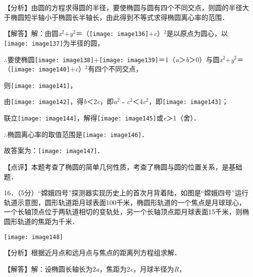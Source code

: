 \documentclass[a4paper,11pt,UTF8,twoside]{ctexart} %
\begin{document}
【分析】由圆的方程求得圆的半径，要使椭圆与圆有四个不同交点，则圆的半径大于椭圆短半轴小于椭圆长半轴长，由此得到不等式求得椭圆离心率的范围．

【解答】解：由圆\textit{x}${}^{2}$+\textit{y}${}^{2}$＝（\texttt{[image: image136]}+\textit{c}）${}^{2}$是以原点为圆心，以\texttt{[image: image137]}为半径的圆，

$\mathrm{\therefore}$要使椭圆\texttt{[image: image138]}+\texttt{[image: image139]}＝1（\textit{a}＞\textit{b}＞0）与圆\textit{x}${}^{2}$+\textit{y}${}^{2}$＝（\texttt{[image: image140]}+\textit{c}）${}^{2}$有四个不同交点，

则\texttt{[image: image141]}，

由\texttt{[image: image142]}，得\textit{b}＜2\textit{c}，即\textit{a}${}^{2}$﹣\textit{c}${}^{2}$＜4\textit{c}${}^{2}$，即\texttt{[image: image143]}；

联立\texttt{[image: image144]}，解得\texttt{[image: image145]}或\textit{e}＞1（舍）．

$\mathrm{\therefore}$椭圆离心率的取值范围是\texttt{[image: image146]}．

故答案为：\texttt{[image: image147]}．

【点评】本题考查了椭圆的简单几何性质，考查了椭圆与圆的位置关系，是基础题．

16．（5分）``嫦娥四号''探测器实现历史上的首次月背着陆，如图是``嫦娥四号''运行轨道示意图，圆形轨道距月球表面100千米，椭圆形轨道的一个焦点是月球球心，一个长轴顶点位于两轨道相切的变轨处，另一个长轴顶点距月球表面15千米，则椭圆形轨道的焦距为千米．

\texttt{[image: image148]}

【分析】根据近月点和远月点与焦点的距离列方程组求解．

【解答】解：设椭圆长轴长为2\textit{a}，焦距为2\textit{c}，月球半径为\textit{R}，
\end{document}
